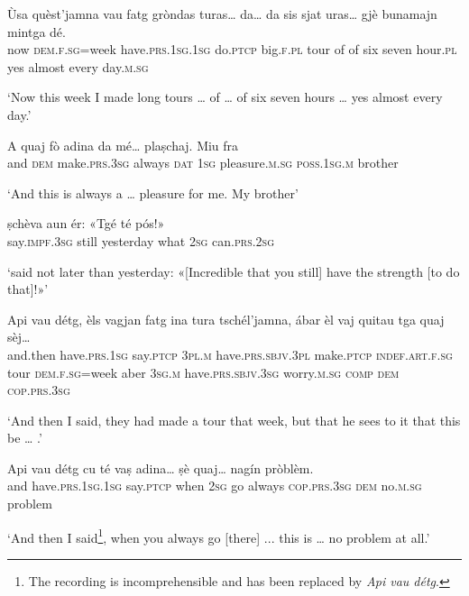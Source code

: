 \begin{linenumbers}
\gll Ùsa quèst’jamna vau fatg gròndas turas… da… da sis sjat uras… gjè bunamajn mintga dé.  \\
now \textsc{dem.f.sg}=week have.\textsc{prs.1sg.1sg} do.\textsc{ptcp} big.\textsc{f.pl} tour of of six seven hour.\textsc{pl} yes almost every day.\textsc{m.sg}  \\
\end{linenumbers}
\medskip
\glt `Now this week I made long tours … of … of six seven hours … yes almost every day.'
\medskip

\begin{linenumbers}
\gll  A quaj fò adina da mé… plaṣchaj. Miu fra  \\
and \textsc{dem} make.\textsc{prs.3sg} always \textsc{dat} \textsc{1sg} pleasure.\textsc{m.sg} \textsc{poss.1sg.m} brother \\
\end{linenumbers}
\medskip
\glt `And this is always a … pleasure for me. My brother'
\medskip

\begin{linenumbers}
\gll ṣchèva aun ér: «Tgé té pós!»   \\
 say.\textsc{impf.3sg} still yesterday what \textsc{2sg} can.\textsc{prs.2sg} \\
\end{linenumbers}
\medskip
\glt `said not later than yesterday: «[Incredible that you still] have the strength [to do that]!»'
\medskip

\begin{linenumbers}
\gll Api vau détg, èls vagjan fatg ina tura tschél’jamna, ábar èl vaj quitau tga quaj sèj…\\  
and.then have.\textsc{prs.1sg} say.\textsc{ptcp} \textsc{3pl.m} have.\textsc{prs.sbjv.3pl} make.\textsc{ptcp} \textsc{indef.art.f.sg} tour  \textsc{dem.f.sg=}week aber \textsc{3sg.m} have.\textsc{prs.sbjv.3sg} worry.\textsc{m.sg} \textsc{comp} \textsc{dem} \textsc{cop.prs.3sg} \\
\end{linenumbers}
\medskip
\glt `And then I said, they had made a tour that week, but that he sees to it that this be … .'
\medskip

\begin{linenumbers}
\gll  Api vau détg cu té vaṣ adina… ṣè quaj… nagín pròblèm.  \\
and have.\textsc{prs.1sg.1sg} say.\textsc{ptcp} when \textsc{2sg} go always \textsc{cop.prs.3sg} \textsc{dem} no.\textsc{m.sg} problem \\
\end{linenumbers}
\medskip
\glt `And then I said\footnote{The recording is incomprehensible and has been replaced by \textit{Api vau détg}.}, when you always go [there] ... this is … no problem at all.'
\medskip

